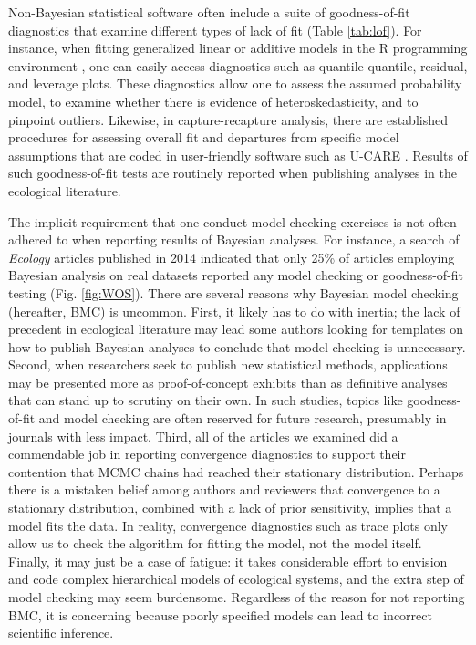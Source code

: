 \documentclass[12pt,english]{article}
\begin{document}
\begin{spacing}{1.9}
Non-Bayesian statistical software often include a suite of
goodness-of-fit diagnostics that examine different types of lack of
fit (Table \ref{tab:lof}).  For instance, when fitting generalized
linear \citep{McCullaghNelder1989} or additive \citep{Wood2006} models
in the R programming environment \citep{RTeam2017}, one can easily
access diagnostics such as quantile-quantile, residual, and leverage
plots.  These diagnostics allow one to assess the assumed probability
model, to examine whether there is evidence of heteroskedasticity, and
to pinpoint outliers.  Likewise, in capture-recapture analysis, there
are established procedures for assessing overall fit and departures
from specific model assumptions that are coded in user-friendly
software such as U-CARE \citep{ChoquetEtAl2009}.  Results of such
goodness-of-fit tests are routinely reported when publishing analyses
in the ecological literature.

The implicit requirement that one conduct model checking exercises is
not often adhered to when reporting results of Bayesian analyses.  For
instance, a search of \textit{Ecology} articles published in 2014 indicated that only
25\% of articles employing Bayesian analysis on real datasets reported
any model checking or goodness-of-fit testing (Fig. \ref{fig:WOS}).
There are several reasons why Bayesian model checking (hereafter, BMC)
is uncommon.  First, it likely has to do with inertia; the lack of
precedent in ecological literature may lead some authors looking for
templates on how to publish Bayesian analyses to conclude that model
checking is unnecessary.  Second, when researchers seek to publish new
statistical methods, applications may be presented more as
proof-of-concept exhibits than as definitive analyses that can stand
up to scrutiny on their own. In such studies, topics like
goodness-of-fit and model checking are often reserved for future
research, presumably in journals with less impact.  Third, all of the
articles we examined did a commendable job in reporting convergence
diagnostics to support their contention that MCMC chains had reached
their stationary distribution.  Perhaps there is a mistaken belief
among authors and reviewers that convergence to a stationary
distribution, combined with a lack of prior sensitivity, implies that
a model fits the data.  In reality, convergence diagnostics such as trace plots only allow us to check the algorithm for fitting the model, not the model itself. Finally, it may just be a case of fatigue: it
takes considerable effort to envision and code complex hierarchical
models of ecological systems, and the extra step of model checking may
seem burdensome.  Regardless of the reason for not reporting BMC, it is
concerning because poorly specified models can lead to incorrect scientific inference.


\end{spacing}
\end{document}
